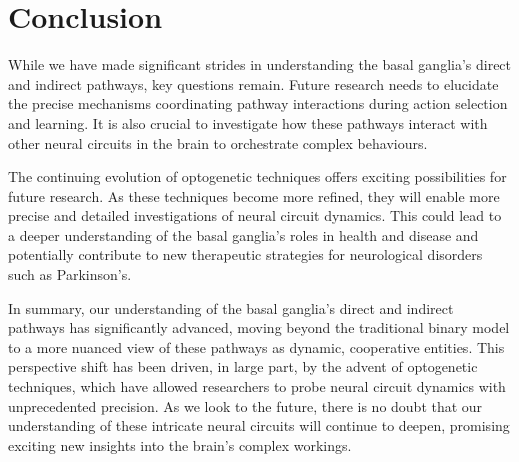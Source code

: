 \documentclass[10pt]{article}
\begin{document}
\begin{sloppypar}
  \section{Conclusion}
  \label{sec:conclusion}

  While we have made significant strides in understanding the basal ganglia’s direct and indirect pathways, key questions remain. Future research needs to elucidate the precise mechanisms coordinating pathway interactions during action selection and learning. It is also crucial to investigate how these pathways interact with other neural circuits in the brain to orchestrate complex behaviours.

  The continuing evolution of optogenetic techniques offers exciting possibilities for future research. As these techniques become more refined, they will enable more precise and detailed investigations of neural circuit dynamics. This could lead to a deeper understanding of the basal ganglia’s roles in health and disease and potentially contribute to new therapeutic strategies for neurological disorders such as Parkinson’s.

  In summary, our understanding of the basal ganglia’s direct and indirect pathways has significantly advanced, moving beyond the traditional binary model to a more nuanced view of these pathways as dynamic, cooperative entities. This perspective shift has been driven, in large part, by the advent of optogenetic techniques, which have allowed researchers to probe neural circuit dynamics with unprecedented precision. As we look to the future, there is no doubt that our understanding of these intricate neural circuits will continue to deepen, promising exciting new insights into the brain’s complex workings.

  \pagebreak
  \singlespacing %
  
  

\end{sloppypar}
\end{document}
